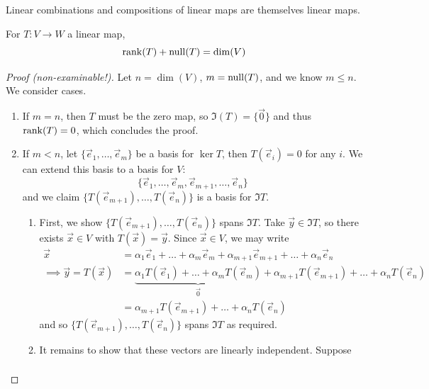 \documentclass{../../template/note}
\begin{document}
    \begin{proposition}
        Linear combinations and compositions of linear maps are themselves linear maps.
    \end{proposition}
    
    \begin{theorem}
        For \(T: V \to W\) a linear map,
        \[
            \operatorname{rank}(T) + \operatorname{null}(T) = \dim(V)
        \]
    \end{theorem}
    
    \begin{proof}[Proof (non-examinable!)]
        Let \(n = \dim(V)\), \(m = \operatorname{null}(T)\), and we know \(m \leq n\). We consider cases.
        \begin{enumerate}
            \item If \(m = n\), then \(T\) must be the zero map, so \(\Im(T) = \{\vec 0\}\) and thus \(\operatorname{rank}(T) = 0\), which concludes the proof.
            \item If \(m < n\), let \(\{\vec e_1, \dots, \vec e_m\}\) be a basis for \(\ker T\), then \(T(\vec e_i) = 0\) for any \(i\). We can extend this basis to a basis for \(V\):
            \[
                \{\vec e_1, \dots, \vec e_m, \vec e_{m+1}, \dots, \vec e_n\}
            \]
            and we claim \(\{T(\vec e_{m+1}), \dots, T(\vec e_n)\}\) is a basis for \(\Im T\).
            \begin{enumerate}
                \item First, we show \(\{T(\vec e_{m+1}), \dots, T(\vec e_n)\}\) spans \(\Im T\). Take \(\vec y \in \Im T\), so there exists \(\vec x \in V\) with \(T(\vec x) = \vec y\). Since \(\vec x \in V\), we may write
                \begin{align*}
                    \vec x &= \alpha_1 \vec e_1 + \dots + \alpha_m \vec e_m + \alpha_{m+1} \vec e_{m+1 }+ \dots + \alpha_n \vec e_n \\
                    \implies \vec y = T(\vec x) &= \underbrace{\alpha_1 T(\vec e_1) + \dots + \alpha_m T(\vec e_m)}_{\vec 0} + \alpha_{m+1} T(\vec e_{m+1})+ \dots + \alpha_n T(\vec e_n) \\
                    &= \alpha_{m+1} T(\vec e_{m+1})+ \dots + \alpha_n T(\vec e_n)
                \end{align*}
                and so \(\{T(\vec e_{m+1}), \dots, T(\vec e_n)\}\) spans \(\Im T\) as required.
                \item It remains to show that these vectors are linearly independent. Suppose
                \begin{align*}

\end{align*}
\end{enumerate}
\end{enumerate}
\end{proof}
\end{document}
